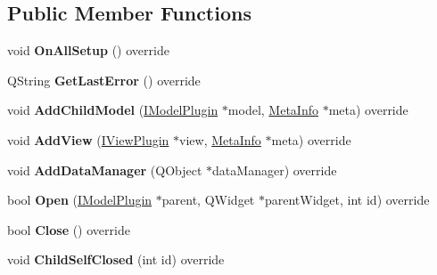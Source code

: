 \subsection*{Public Member Functions}
\begin{DoxyCompactItemize}
\item 
\mbox{\label{class_neural_network_model_ae10c5a6387aa0752663d4c0ee07ed5ca}} 
void {\bfseries On\+All\+Setup} () override
\item 
\mbox{\label{class_neural_network_model_ab9c3d8c5d6ae87dc0ed6e0650e614eb3}} 
Q\+String {\bfseries Get\+Last\+Error} () override
\item 
\mbox{\label{class_neural_network_model_a76c4f2032b0bc283e59efcf90617ca45}} 
void {\bfseries Add\+Child\+Model} (\hyperlink{class_i_model_plugin}{I\+Model\+Plugin} $\ast$model, \hyperlink{struct_meta_info}{Meta\+Info} $\ast$meta) override
\item 
\mbox{\label{class_neural_network_model_ab819ce176d4dd2d2709b4db3304db5ef}} 
void {\bfseries Add\+View} (\hyperlink{class_i_view_plugin}{I\+View\+Plugin} $\ast$view, \hyperlink{struct_meta_info}{Meta\+Info} $\ast$meta) override
\item 
\mbox{\label{class_neural_network_model_ad20c25a3b27c40fbb448997adbf35e72}} 
void {\bfseries Add\+Data\+Manager} (Q\+Object $\ast$data\+Manager) override
\item 
\mbox{\label{class_neural_network_model_af003d712b60ba136f9fd1ace2fd259b6}} 
bool {\bfseries Open} (\hyperlink{class_i_model_plugin}{I\+Model\+Plugin} $\ast$parent, Q\+Widget $\ast$parent\+Widget, int id) override
\item 
\mbox{\label{class_neural_network_model_abb5e21816c1d96313a45e4618a1ff933}} 
bool {\bfseries Close} () override
\item 
\mbox{\label{class_neural_network_model_addf09b66c86a981187257b82c030542d}} 
void {\bfseries Child\+Self\+Closed} (int id) override
\item 

\end{DoxyCompactItemize}
